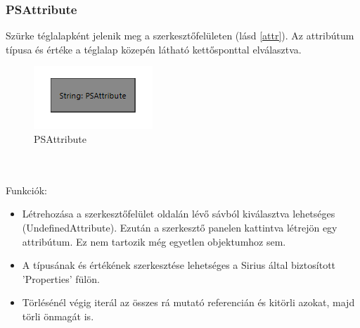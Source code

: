 \subsubsection{PSAttribute}
Szürke téglalapként jelenik meg a szerkesztőfelületen (lásd \autoref{attr}). Az attribútum típusa és értéke a téglalap közepén látható kettősponttal elválasztva.
\begin{figure}[!ht]
	\centering
	\includegraphics{figures/attr.PNG}
	\caption{PSAttribute}
	\label{attr} 
\end{figure}
\\\\
Funkciók:
\begin{itemize}  	
	\item Létrehozása a szerkesztőfelület oldalán lévő sávból kiválasztva lehetséges (UndefinedAttribute). Ezután a szerkesztő panelen kattintva létrejön egy attribútum. Ez nem tartozik még egyetlen objektumhoz sem.
	
	\item A típusának és értékének szerkesztése lehetséges a Sirius által biztosított 'Properties' fülön.
	
	\item Törlésénél végig iterál az összes rá mutató referencián és kitörli azokat, majd törli önmagát is.	

\end{itemize}

